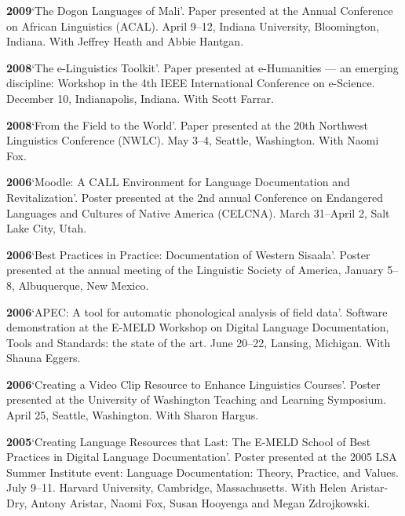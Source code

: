 \documentclass[11pt]{article}
\newcommand{\hangpara}{
 \setlength{\parindent}{0in} %
 \hangindent=0.42in %
}
\begin{document}
\vskip 6pt
\hangpara
{\bf 2009}\hspace{1ex}`The Dogon Languages of Mali'. Paper presented at the Annual Conference on African Linguistics (ACAL). April 9--12, Indiana University, Bloomington, Indiana. With Jeffrey Heath and Abbie Hantgan.

\vskip 6pt
\hangpara
{\bf 2008}\hspace{1ex}`The e-Linguistics Toolkit'. Paper presented at e-Humanities --- an emerging discipline: Workshop in the 4th IEEE International Conference on e-Science. December 10, Indianapolis, Indiana. With Scott Farrar.

\vskip 6pt
\hangpara
{\bf 2008}\hspace{1ex}`From the Field to the World'. Paper presented at the 20th Northwest Linguistics Conference (NWLC). May 3--4, Seattle, Washington. With Naomi Fox.

\vskip 6pt
\hangpara
{\bf 2006}\hspace{1ex}`Moodle: A CALL Environment for Language Documentation and Revitalization'. Poster presented at the 2nd annual Conference on Endangered Languages and Cultures of Native America (CELCNA). March 31--April 2, Salt Lake City, Utah.

\vskip 6pt
\hangpara
{\bf 2006}\hspace{1ex}`Best Practices in Practice: Documentation of Western Sisaala'. Poster presented at the annual meeting of the Linguistic Society of America, January 5--8, Albuquerque, New Mexico.

\vskip 6pt
\hangpara
{\bf 2006}\hspace{1ex}`APEC: A tool for automatic phonological analysis of field data'. Software demonstration at the E-MELD Workshop on Digital Language Documentation, Tools and Standards: the state of the art. June 20--22, Lansing, Michigan. With Shauna Eggers.

\vskip 6pt
\hangpara
{\bf 2006}\hspace{1ex}`Creating a Video Clip Resource to Enhance Linguistics Courses'. Poster presented at the University of Washington Teaching and Learning Symposium. April 25, Seattle, Washington. With Sharon Hargus.

\vskip 6pt
\hangpara
{\bf 2005}\hspace{1ex}`Creating Language Resources that Last: The E-MELD School of Best Practices in Digital Language Documentation'. Poster presented at the 2005 LSA Summer Institute event: Language Documentation: Theory, Practice, and Values. July 9--11. Harvard University, Cambridge, Massachusetts. With Helen Aristar-Dry, Antony Aristar, Naomi Fox, Susan Hooyenga and Megan Zdrojkowski.
\end{document}
